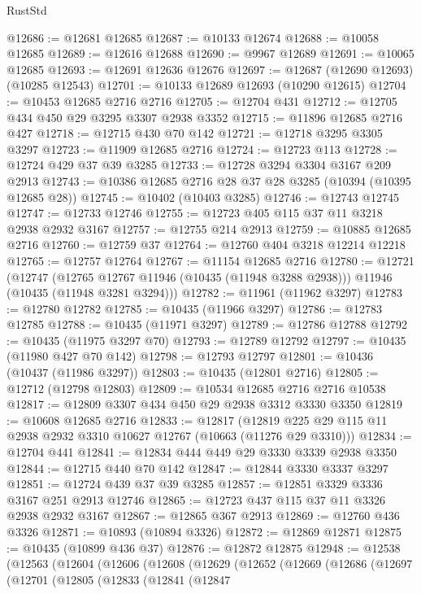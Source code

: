 \begin{lexlean}{RustStd}
\begin{coremodule}
@12686 := @12681 @12685
@12687 := @10133 @12674
@12688 := @10058 @12685
@12689 := @12616 @12688
@12690 := @9967 @12689
@12691 := @10065 @12685
@12693 := @12691 @12636 @12676
@12697 := @12687 (@12690 @12693) (@10285 @12543)
@12701 := @10133 @12689 @12693 (@10290 @12615)
@12704 := @10453 @12685 @2716 @2716
@12705 := @12704 @431
@12712 := @12705 @434 @450 @29 @3295 @3307 @2938 @3352
@12715 := @11896 @12685 @2716 @427
@12718 := @12715 @430 @70 @142
@12721 := @12718 @3295 @3305 @3297
@12723 := @11909 @12685 @2716
@12724 := @12723 @113
@12728 := @12724 @429 @37 @39 @3285
@12733 := @12728 @3294 @3304 @3167 @209 @2913
@12743 := @10386 @12685 @2716 @28 @37 @28 @3285 (@10394 (@10395 @12685 @28))
@12745 := @10402 (@10403 @3285)
@12746 := @12743 @12745
@12747 := @12733 @12746
@12755 := @12723 @405 @115 @37 @11 @3218 @2938 @2932 @3167
@12757 := @12755 @214 @2913
@12759 := @10885 @12685 @2716
@12760 := @12759 @37
@12764 := @12760 @404 @3218 @12214 @12218
@12765 := @12757 @12764
@12767 := @11154 @12685 @2716
@12780 := @12721
    (@12747
      (@12765 @12767 @11946 (@10435 (@11948 @3288 @2938)))
      @11946
      (@10435 (@11948 @3281 @3294)))
@12782 := @11961 (@11962 @3297)
@12783 := @12780 @12782
@12785 := @10435 (@11966 @3297)
@12786 := @12783 @12785
@12788 := @10435 (@11971 @3297)
@12789 := @12786 @12788
@12792 := @10435 (@11975 @3297 @70)
@12793 := @12789 @12792
@12797 := @10435 (@11980 @427 @70 @142)
@12798 := @12793 @12797
@12801 := @10436 (@10437 (@11986 @3297))
@12803 := @10435 (@12801 @2716)
@12805 := @12712 (@12798 @12803)
@12809 := @10534 @12685 @2716 @2716 @10538
@12817 := @12809 @3307 @434 @450 @29 @2938 @3312 @3330 @3350
@12819 := @10608 @12685 @2716
@12833 := @12817
    (@12819 @225 @29 @115 @11 @2938 @2932 @3310 @10627 @12767 (@10663 (@11276 @29 @3310)))
@12834 := @12704 @441
@12841 := @12834 @444 @449 @29 @3330 @3339 @2938 @3350
@12844 := @12715 @440 @70 @142
@12847 := @12844 @3330 @3337 @3297
@12851 := @12724 @439 @37 @39 @3285
@12857 := @12851 @3329 @3336 @3167 @251 @2913 @12746
@12865 := @12723 @437 @115 @37 @11 @3326 @2938 @2932 @3167
@12867 := @12865 @367 @2913
@12869 := @12760 @436 @3326
@12871 := @10893 (@10894 @3326)
@12872 := @12869 @12871
@12875 := @10435 (@10899 @436 @37)
@12876 := @12872 @12875
@12948 := @12538
    (@12563
      (@12604
        (@12606
          (@12608
            (@12629
              (@12652
                (@12669
                  (@12686
                    (@12697
                      (@12701
                        (@12805
                          (@12833
                            (@12841
                              (@12847

\end{coremodule}
\end{lexlean}
